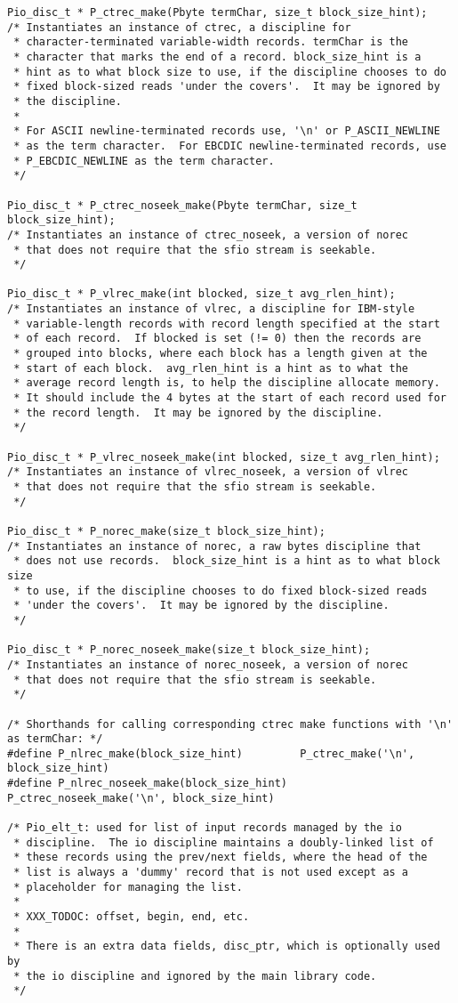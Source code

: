 \begin{verbatim}
Pio_disc_t * P_ctrec_make(Pbyte termChar, size_t block_size_hint);
/* Instantiates an instance of ctrec, a discipline for
 * character-terminated variable-width records. termChar is the
 * character that marks the end of a record. block_size_hint is a
 * hint as to what block size to use, if the discipline chooses to do
 * fixed block-sized reads 'under the covers'.  It may be ignored by
 * the discipline.
 * 
 * For ASCII newline-terminated records use, '\n' or P_ASCII_NEWLINE
 * as the term character.  For EBCDIC newline-terminated records, use
 * P_EBCDIC_NEWLINE as the term character.
 */

Pio_disc_t * P_ctrec_noseek_make(Pbyte termChar, size_t block_size_hint);
/* Instantiates an instance of ctrec_noseek, a version of norec
 * that does not require that the sfio stream is seekable.
 */

Pio_disc_t * P_vlrec_make(int blocked, size_t avg_rlen_hint);
/* Instantiates an instance of vlrec, a discipline for IBM-style
 * variable-length records with record length specified at the start
 * of each record.  If blocked is set (!= 0) then the records are
 * grouped into blocks, where each block has a length given at the
 * start of each block.  avg_rlen_hint is a hint as to what the
 * average record length is, to help the discipline allocate memory.
 * It should include the 4 bytes at the start of each record used for
 * the record length.  It may be ignored by the discipline.
 */

Pio_disc_t * P_vlrec_noseek_make(int blocked, size_t avg_rlen_hint);
/* Instantiates an instance of vlrec_noseek, a version of vlrec
 * that does not require that the sfio stream is seekable.
 */

Pio_disc_t * P_norec_make(size_t block_size_hint);
/* Instantiates an instance of norec, a raw bytes discipline that
 * does not use records.  block_size_hint is a hint as to what block size
 * to use, if the discipline chooses to do fixed block-sized reads
 * 'under the covers'.  It may be ignored by the discipline.
 */

Pio_disc_t * P_norec_noseek_make(size_t block_size_hint);
/* Instantiates an instance of norec_noseek, a version of norec
 * that does not require that the sfio stream is seekable.
 */

/* Shorthands for calling corresponding ctrec make functions with '\n' as termChar: */
#define P_nlrec_make(block_size_hint)         P_ctrec_make('\n', block_size_hint)
#define P_nlrec_noseek_make(block_size_hint)  P_ctrec_noseek_make('\n', block_size_hint)

/* Pio_elt_t: used for list of input records managed by the io
 * discipline.  The io discipline maintains a doubly-linked list of
 * these records using the prev/next fields, where the head of the
 * list is always a 'dummy' record that is not used except as a
 * placeholder for managing the list.
 * 
 * XXX_TODOC: offset, begin, end, etc.
 *
 * There is an extra data fields, disc_ptr, which is optionally used by
 * the io discipline and ignored by the main library code.
 */
\end{verbatim}


